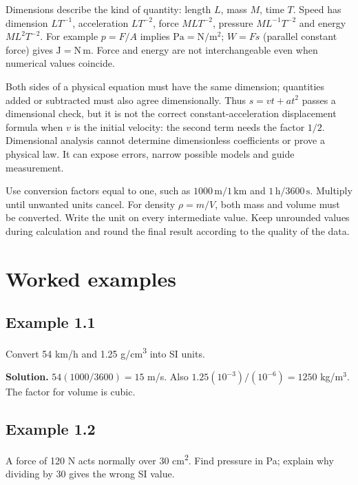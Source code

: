 \documentclass[11pt,a4paper,openany]{book}
\begin{document}
Dimensions describe the kind of quantity: length $L$, mass $M$, time $T$. Speed has dimension $LT^{-1}$, acceleration $LT^{-2}$, force $MLT^{-2}$, pressure $ML^{-1}T^{-2}$ and energy $ML^2T^{-2}$. For example $p=F/A$ implies $\mathrm{Pa=N/m^2}$; $W=Fs$ (parallel constant force) gives $\mathrm{J=N\,m}$. Force and energy are not interchangeable even when numerical values coincide.

Both sides of a physical equation must have the same dimension; quantities added or subtracted must also agree dimensionally. Thus $s=vt+at^2$ passes a dimensional check, but it is not the correct constant-acceleration displacement formula when $v$ is the initial velocity: the second term needs the factor $1/2$. Dimensional analysis cannot determine dimensionless coefficients or prove a physical law. It can expose errors, narrow possible models and guide measurement.

Use conversion factors equal to one, such as $1000\,\mathrm{m}/1\,\mathrm{km}$ and $1\,\mathrm{h}/3600\,\mathrm{s}$. Multiply until unwanted units cancel. For density $\rho=m/V$, both mass and volume must be converted. Write the unit on every intermediate value. Keep unrounded values during calculation and round the final result according to the quality of the data.
\begin{center}
\end{center}
\section{Worked examples}
\subsection*{Example 1.1}
Convert 54 km/h and 1.25 g/cm\textsuperscript{3} into SI units.

\textbf{Solution.} $54(1000/3600)=15$ m/s. Also $1.25(10^{-3})/(10^{-6})=1250$ kg/m$^3$. The factor for volume is cubic.
\subsection*{Example 1.2}
A force of 120 N acts normally over 30 cm\textsuperscript{2}. Find pressure in Pa; explain why dividing by 30 gives the wrong SI value.
\end{document}
